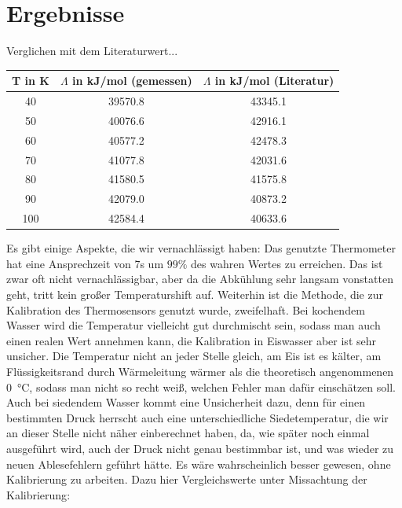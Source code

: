 \documentclass[]{article}
\begin{document}
	\section{Ergebnisse}
	{\color{red} Verglichen mit dem Literaturwert...}
	
	\begin{center}
		
		\begin{tabular}{|c|c|c|}
			\hline
			T in K & $\Lambda$ in kJ/mol (gemessen) &  $\Lambda$ in kJ/mol (Literatur)\\
			\hline
			\hline
			40 & 39570.8 & 43345.1\\
			\hline
			50 & 40076.6 & 42916.1\\
			\hline
			60 & 40577.2 & 42478.3\\
			\hline
			70 & 41077.8 & 42031.6\\
			\hline
			80 & 41580.5 & 41575.8\\
			\hline
			90 & 42079.0 & 40873.2\\
			\hline
			100 & 42584.4 & 40633.6\\
			\hline  			
		\end{tabular} 
	\end{center}
	Es gibt einige Aspekte, die wir vernachlässigt haben:
	Das genutzte Thermometer hat eine Ansprechzeit von 7s um $99\%$ des wahren Wertes zu erreichen. Das ist zwar oft nicht vernachlässigbar, aber da die Abkühlung sehr langsam vonstatten geht, tritt kein großer Temperaturshift auf.
	Weiterhin ist die Methode, die zur Kalibration des Thermosensors genutzt wurde, zweifelhaft. Bei kochendem Wasser wird die Temperatur vielleicht gut durchmischt sein, sodass man auch einen realen Wert annehmen kann, die Kalibration in Eiswasser aber ist sehr unsicher. Die Temperatur nicht an jeder Stelle gleich, am Eis ist es kälter, am Flüssigkeitsrand durch Wärmeleitung wärmer als die theoretisch angenommenen \SI{0}{\celsius}, sodass man nicht so recht weiß, welchen Fehler man dafür einschätzen soll. Auch bei siedendem Wasser kommt eine Unsicherheit dazu, denn für einen bestimmten Druck herrscht auch eine unterschiedliche Siedetemperatur, die wir an dieser Stelle nicht näher einberechnet haben, da, wie später noch einmal ausgeführt wird, auch der Druck nicht genau bestimmbar ist, und was wieder zu neuen Ablesefehlern geführt hätte.
	Es wäre wahrscheinlich besser gewesen, ohne Kalibrierung zu arbeiten. {\color{red}Dazu hier Vergleichswerte unter Missachtung der Kalibrierung}:\\
\end{document}
